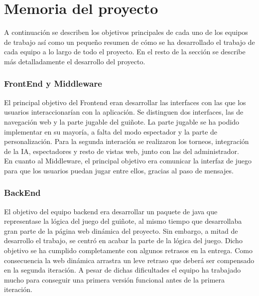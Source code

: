 \section{Memoria del proyecto}
\label{memoria}
A continuación se describen los objetivos principales de cada uno de los equipos de trabajo así como un pequeño resumen de cómo se ha desarrollado el trabajo de cada equipo a lo largo de todo el proyecto. En el resto de la sección se describe más detalladamente el desarrollo del proyecto.\\

\subsubsection*{FrontEnd y Middleware}
El principal objetivo del Frontend eran desarrollar las interfaces con las que los usuarios interaccionarían con la aplicación. Se distinguen dos interfaces, las de navegación web y la parte jugable del guiñote. La parte jugable se ha podido implementar en su mayoría, a falta del modo espectador y la parte de personalización. Para la segunda interación se realizaron los torneos, integración de la IA, espectadores y resto de vistas web, junto con las del administrador.
\\
En cuanto al Middleware, el principal objetivo era comunicar la interfaz de juego para que los usuarios puedan jugar entre ellos, gracias al paso de mensajes.

\subsubsection*{BackEnd}
El objetivo del equipo backend era desarrollar un paquete de java que representase la lógica del juego del guiñote, al mismo tiempo que desarrollaba gran parte de la página web dinámica del proyecto. Sin embargo, a mitad de desarrollo el trabajo, se centró en acabar la parte de la lógica del juego. Dicho objetivo se ha cumplido completamente con algunos retrasos en la entrega. Como consecuencia la web dinámica arrastra un leve retraso que deberá ser compensado en la segunda iteración. A pesar de dichas dificultades el equipo ha trabajado mucho para conseguir una primera versión funcional antes de la primera iteración.

